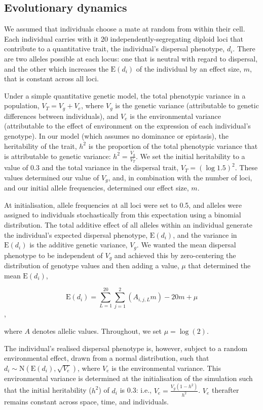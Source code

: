 \documentclass{article}
\begin{document}
\subsection{Evolutionary dynamics}

We assumed that individuals choose a mate at random from within their cell. Each
individual carries with it 20 independently-segregating diploid loci that contribute to a quantitative trait, the individual's dispersal phenotype, $d_i$.  There are two alleles possible at each locus: one that is neutral with
regard to dispersal, and the other which increases the \(\text{E}(d_i)\)
of the individual by an effect size, $m$, that is constant across all
loci. 

Under a simple quantitative genetic model, the total phenotypic variance in a population, $V_T=V_g + V_e$, where $V_g$ is the genetic variance (attributable to genetic differences between individuals), and $V_e$ is the environmental variance (attributable to the effect of environment on the expression of each individual's genotype).  In our model (which assumes no dominance or epistasis), the heritability of the trait, $h^2$ is the proportion of the total phenotypic variance that is attributable to genetic variance: $h^2=\frac{V_g}{V_T}$.  We set the initial heritability to a value of 0.3 and the total variance in the dispersal trait, $V_T=(\log{1.5})^2$.  These values determined our value of $V_g$, and, in combination with the number of loci, and our initial allele frequencies, determined our effect size, $m$.

At initialisation, allele frequencies at all loci were set to 0.5, and alleles were assigned to individuals stochastically from this expectation using a binomial distribution. The
total additive effect of all alleles within an individual generate the
individual's expected dispersal phenotype, \(\text{E}(d_i)\), and the variance in \(\text{E}(d_i)\) is the additive genetic variance, $V_g$.  We wanted the mean dispersal phenotype to be independent of $V_g$ and achieved this by zero-centering the distribution of genotype values and then adding a value, $\mu$ that determined the mean \(\text{E}(d_i)\),

\[ \text{E}(d_i)=\sum_{L=1}^{20}\sum_{j=1}^{2}(A_{i,j,L}m)-20m+\mu\],

where $A$ denotes allelic values.  Throughout, we set $\mu=\log(2)$.

The individual's realised dispersal
phenotype is, however, subject to a random environmental effect, drawn from a normal distribution, such
that \(d_i\sim\text{N}(\text{E}(d_i), \sqrt{V_e})\), where \(V_e\) is
the environmental variance. This environmental variance is determined at
the initialisation of the simulation such that the initial heritability ($h^2$)
of \(d_i\) is 0.3: i.e., \(V_e=\frac{V_g(1-h^2)}{h^2}\). \(V_e\)
therafter remains constant across space, time, and individuals.
\end{document}
